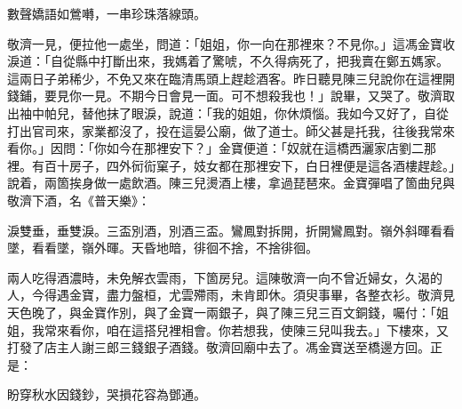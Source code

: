 \begin{myquote}
數聲嬌語如鶯囀，一串珍珠落線頭。
\end{myquote}

敬濟一見，便拉他一處坐，問道：「姐姐，你一向在那裡來？不見你。」這馮金寶收淚道：「自從縣中打斷出來，我媽着了驚唬，不久得病死了，把我賣在鄭五媽家。這兩日子弟稀少，不免又來在臨清馬頭上趕趁酒客。昨日聽見陳三兒說你在這裡開錢鋪，要見你一見。不期今日會見一面。可不想殺我也！」說畢，又哭了。敬濟取出袖中帕兒，替他抹了眼淚，說道：「我的姐姐，你休煩惱。我如今又好了，{}自從打出官司來，家業都沒了，投在這晏公廟，做了道士。師父甚是托我，往後我常來看你。」因問：「你如今在那裡安下？」金寶便道：「奴就在這橋西灑家店劉二那裡。有百十房子，四外衏䘕窠子，妓女都在那裡安下，白日裡便是這各酒樓趕趁。」說着，兩箇挨身做一處飲酒。陳三兒燙酒上樓，拿過琵琶來。金寶彈唱了箇曲兒與敬濟下酒，名《普天樂》：

\begin{myquote}
淚雙垂，垂雙淚。三盃別酒，別酒三盃。鸞鳳對拆開，折開鸞鳳對。嶺外斜暉看看墜，看看墜，嶺外暉。天昏地暗，徘徊不捨，不捨徘徊。
\end{myquote}

兩人吃得酒濃時，未免解衣雲雨，下箇房兒。這陳敬濟一向不曾近婦女，久渴的人，今得遇金寶，盡力盤桓，尤雲殢雨，未肯即休。須臾事畢，各整衣衫。敬濟見天色晚了，與金寶作別，與了金寶一兩銀子，與了陳三兒三百文銅錢，囑付：「姐姐，我常來看你，咱在這搭兒裡相會。你若想我，使陳三兒叫我去。」{}下樓來，又打發了店主人謝三郎三錢銀子酒錢。敬濟回廟中去了。馮金寶送至橋邊方回。正是：

\begin{myquote}
盼穿秋水因錢鈔，哭損花容為鄧通。
\end{myquote}

